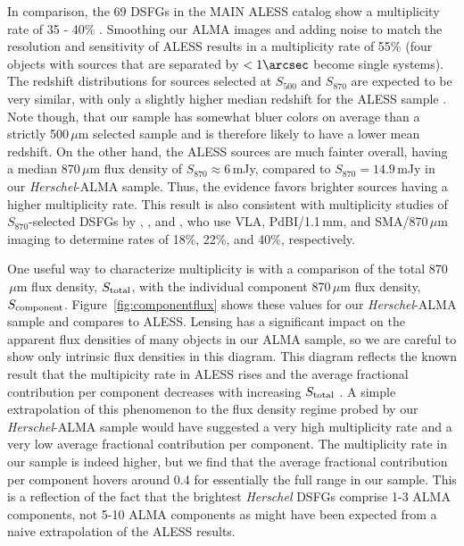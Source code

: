 \documentclass[iop]{emulateapj}
\begin{document}
In comparison, the 69 DSFGs in the MAIN ALESS catalog show a multiplicity rate
of 35 - 40\% \citep{Hodge:2013qy}.  Smoothing our ALMA images and adding
noise to match the resolution and sensitivity of ALESS results in a
multiplicity rate of 55\% (four objects with sources that are separated by
$<1\arcsec$ become single systems).  The redshift distributions for sources
selected at $S_{500}$ and $S_{870}$ are expected to be very similar, with only
a slightly higher median redshift for the ALESS sample \citep[e.g., $z_{\rm
med} = 2.0$ vs.  $z_{\rm med} = 2.2$; see][]{Zavala:2014lr}.  Note though, that
our sample has somewhat bluer colors on average than a strictly 500$\,\mu$m
selected sample and is therefore likely to have a lower mean redshift.
On the other hand, the ALESS sources are much fainter overall, having a median
870$\,\mu$m flux density of $S_{870} \approx 6\,$mJy, compared to $S_{870}
=14.9\,$mJy in our {\it Herschel}-ALMA sample.  Thus, the evidence favors brighter sources
having a higher multiplicity rate.  This result is also consistent with
multiplicity studies of $S_{870}$-selected DSFGs by \citet{Ivison:2007qv},
\citet{Smolcic:2012zl}, and \citet{Barger:2012yg}, who use VLA, PdBI/1.1$\,$mm,
and SMA/870$\,\mu$m imaging to determine rates of 18\%, 22\%, and 40\%,
respectively.

One useful way to characterize multiplicity is with a comparison of the total
870$\,\mu$m flux density, $S_{\rm total}$, with the individual component
870$\,\mu$m flux density, $S_{\rm component}$.  Figure~\ref{fig:componentflux}
shows these values for our {\it Herschel}-ALMA sample and compares to ALESS.
Lensing has a significant impact on the apparent flux densities of many objects
in our ALMA sample, so we are careful to show only intrinsic flux densities in
this diagram.  This diagram reflects the known result that the multipicity rate
in ALESS rises and the average fractional contribution per component decreases
with increasing $S_{\rm total}$ \citep{Hodge:2013qy}.  A simple extrapolation
of this phenomenon to the flux density regime probed by our {\it Herschel}-ALMA
sample would have suggested a very high multiplicity rate and a very low
average fractional contribution per component.  The multiplicity rate in our
sample is indeed higher, but we find that the average fractional contribution
per component hovers around 0.4 for essentially the full range in our sample.
This is a reflection of the fact that the brightest {\it Herschel} DSFGs
comprise 1-3 ALMA components, not 5-10 ALMA components as might have been
expected from a naive extrapolation of the ALESS results.  
\end{document}
